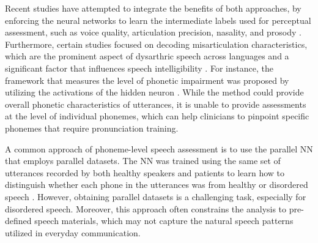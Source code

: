 
Recent studies have attempted to integrate the benefits of both approaches, by enforcing the neural networks to learn the intermediate labels used for perceptual assessment, such as voice quality, articulation precision, nasality, and prosody \cite{tu2017interpretable, xu2021explore}.
Furthermore, certain studies focused on decoding misarticulation characteristics, which are the prominent aspect of dysarthric speech across languages \cite{yeo2022multilingual} and a significant factor that influences speech intelligibility \cite{de2002intelligibility}. 
For instance, the framework that measures the level of phonetic impairment was proposed by utilizing the activations of the hidden neuron \cite{abderrazek2022interpreting, abderrazek2022validation}.
While the method could provide overall phonetic characteristics of utterances, it is unable to provide assessments at the level of individual phonemes, which can help clinicians to pinpoint specific phonemes that require pronunciation training.



A common approach of phoneme-level speech assessment is to use the parallel NN that employs parallel datasets. 
The NN was trained using the same set of utterances recorded by both healthy speakers and patients to learn how to distinguish whether each phone in the utterances was from healthy or disordered speech \cite{miller2020assessing,quintas2022automatic}.
However, obtaining parallel datasets is a challenging task, especially for disordered speech.
Moreover, this approach often constrains the analysis to pre-defined speech materials, which may not capture the natural speech patterns utilized in everyday communication.



